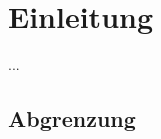 
\chapter{Einleitung}\label{sec:einleitung}

...
			
\section{Abgrenzung}\label{sec:abgrenzung}
 

		